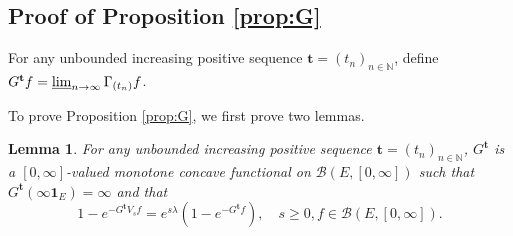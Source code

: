 \documentclass[12pt,a4paper]{amsart}
\numberwithin{equation}{section}
\theoremstyle{plain}
\newtheorem{lem}[thm]{Lemma}
\theoremstyle{definition}
\theoremstyle{remark}
\begin{document}
\subsection{Proof of Proposition \ref{prop:G}}\label{sec:G}
	For any unbounded increasing positive sequence $\mathbf t = (t_n)_{n\in \mathbb N}$, define $G^\mathbf t f = \varliminf_{n\to \infty} \Gamma_{(t_n)} f$.

	To prove Proposition \ref{prop:G}, we first prove two lemmas.

\begin{lem} \label{prop:Gtb:H1:H2:H3:H4}
	For any unbounded increasing positive sequence $\mathbf t = (t_n)_{n\in \mathbb N}$,
	$G^\mathbf t$ is a $[0,\infty]$-valued monotone concave functional on $\mathcal B(E,[0,\infty])$
	such that $G^{\mathbf t}(\infty \mathbf 1_E) = \infty$ and that
\begin{equation}
	1 - e^{-G^\mathbf t V_s f}
	= e^{s\lambda} (1-e^{- G^\mathbf t f}),
	\quad s\geq 0, f\in \mathcal B(E,[0,\infty]).
\end{equation}
\end{lem}
\end{document}
